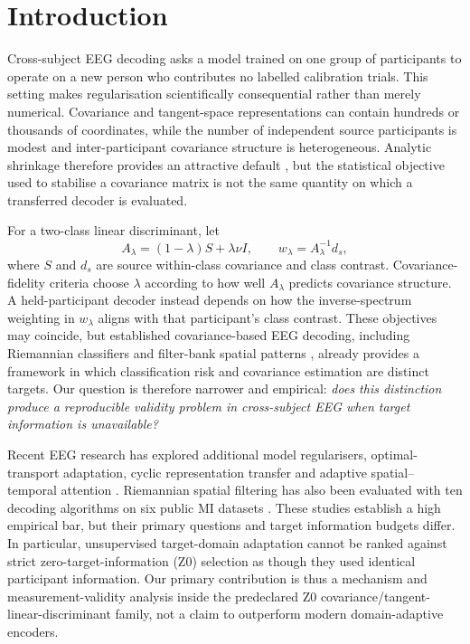 \section{Introduction}

Cross-subject EEG decoding asks a model trained on one group of participants
to operate on a new person who contributes no labelled calibration trials.
This setting makes regularisation scientifically consequential rather than
merely numerical. Covariance and tangent-space representations can contain
hundreds or thousands of coordinates, while the number of independent source
participants is modest and inter-participant covariance structure is
heterogeneous. Analytic shrinkage therefore provides an attractive default
\cite{ledoit2004,chen2010oas},
but the statistical objective used to stabilise a covariance matrix is not the
same quantity on which a transferred decoder is evaluated.

For a two-class linear discriminant, let
\[
 A_\lambda=(1-\lambda)S+\lambda\nu I,
 \qquad
 w_\lambda=A_\lambda^{-1}d_s,
\]
where \(S\) and \(d_s\) are source within-class covariance and class
contrast. Covariance-fidelity criteria choose \(\lambda\) according to how
well \(A_\lambda\) predicts covariance structure. A held-participant decoder
instead depends on how the inverse-spectrum weighting in \(w_\lambda\)
aligns with that participant's class contrast. These objectives may coincide,
but established covariance-based EEG decoding, including Riemannian
classifiers and filter-bank spatial patterns \cite{barachant2012,ang2012fbcsp},
already provides a framework in which classification risk and covariance
estimation are distinct targets. Our
question is therefore narrower and empirical: \emph{does this distinction
produce a reproducible validity problem in cross-subject EEG when target
information is unavailable?}

Recent EEG research has explored additional model regularisers,
optimal-transport adaptation, cyclic representation transfer and adaptive
spatial--temporal attention
\cite{miao2025freezing,morvay2026wbt,he2026cyclic,ren2026asta}.
Riemannian spatial filtering has also been evaluated with ten decoding
algorithms on six public MI datasets \cite{pan2025rsf}. These studies
establish a high empirical bar, but their primary questions and target
information budgets differ. In particular, unsupervised target-domain
adaptation cannot be ranked against strict zero-target-information (Z0)
selection as though they used identical participant information. Our
primary contribution is thus a mechanism and measurement-validity analysis
inside the predeclared Z0 covariance/tangent-linear-discriminant family,
not a claim to outperform modern domain-adaptive encoders.

